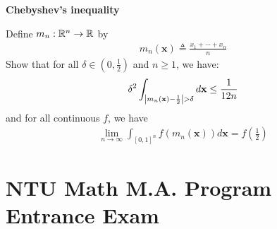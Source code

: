 \documentclass{report}
\begin{document}
\textbf{Chebyshev's inequality} 



\begin{question}{}{}
Define $m_n:\mathbb{R}^n \rightarrow \mathbb{R}$ by 
\begin{align*}
m_n(\textbf{x})\triangleq \frac{x_1+ \cdots + x_n}{n}
\end{align*}
Show that for all $\delta \in (0,\frac{1}{2})$ and $n\geq 1$, we have: 
\begin{align*}
\delta^2 \int_{\left|m_n(\textbf{x})-\frac{1}{2}\right| > \delta} d \textbf{x}  \leq \frac{1}{12n}
\end{align*}
and for all continuous $f$, we have 
\begin{align*}
\lim_{n\to \infty} \int_{[0,1]^n} f(m_n(\textbf{x}))d\textbf{x} = f\left(\frac{1}{2}\right)
\end{align*}
\end{question}
\chapter{NTU Math M.A. Program Entrance Exam}
\end{document}
